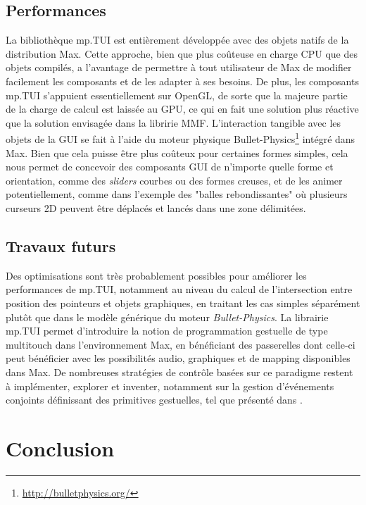 
\subsection{Performances}

\noindent La bibliothèque mp.TUI est entièrement développée avec des objets natifs de la distribution Max. Cette approche, bien que plus coûteuse en charge \gls{CPU} que des objets compilés, a l'avantage de permettre à tout utilisateur de Max de modifier facilement les composants et de les adapter à ses besoins. De plus, les composants mp.TUI s'appuient essentiellement sur OpenGL, de sorte que la majeure partie de la charge de calcul est laissée au \gls{GPU}, ce qui en fait une solution plus réactive que la solution envisagée dans la libririe MMF. L'interaction tangible avec les objets de la \gls{GUI} se fait à l'aide du moteur physique Bullet-Physics\footnote{\url{http://bulletphysics.org/}} intégré dans Max. Bien que cela puisse être plus coûteux pour certaines formes simples, cela nous permet de concevoir des composants \gls{GUI} de n'importe quelle forme et orientation, comme des \textit{sliders} courbes ou des formes creuses, et de les animer potentiellement, comme dans l'exemple des "balles rebondissantes" où plusieurs curseurs 2D peuvent être déplacés et lancés dans une zone délimitées.

\subsection{Travaux futurs}

\noindent Des optimisations sont très probablement possibles pour améliorer les performances de mp.TUI, notamment au niveau du calcul de l'intersection entre position des pointeurs et objets graphiques, en traitant les cas simples séparément plutôt que dans le modèle générique du moteur \textit{Bullet-Physics}.
\noindent La librairie mp.TUI permet d'introduire la notion de programmation gestuelle de type multitouch dans l'environnement Max, en bénéficiant des passerelles dont celle-ci peut bénéficier avec les possibilités audio, graphiques et de mapping disponibles dans Max. De nombreuses stratégies de contrôle basées sur ce paradigme restent à implémenter, explorer et inventer, notamment sur la gestion d'événements conjoints définissant des primitives gestuelles, tel que présenté dans \cite{oney_implementing_2019}.


\section{Conclusion}


